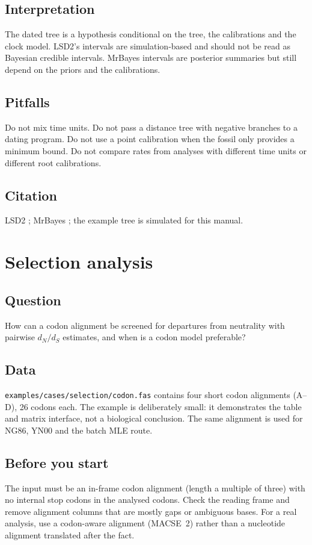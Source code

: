 \documentclass[11pt]{report}
\begin{document}
\section{Interpretation}
The dated tree is a hypothesis conditional on the tree, the calibrations and
the clock model. LSD2's intervals are simulation-based and should not be read
as Bayesian credible intervals. MrBayes intervals are posterior summaries but
still depend on the priors and the calibrations.

\section{Pitfalls}
Do not mix time units. Do not pass a distance tree with negative branches to a
dating program. Do not use a point calibration when the fossil only provides a
minimum bound. Do not compare rates from analyses with different time units or
different root calibrations.

\section{Citation}
LSD2 \cite{lsd2}; MrBayes \cite{mrbayes}; the example tree is simulated for
this manual.

\chapter{Selection analysis}
\section{Question}
How can a codon alignment be screened for departures from neutrality with
pairwise $d_N/d_S$ estimates, and when is a codon model preferable?

\section{Data}
\texttt{examples/cases/selection/codon.fas} contains four short codon
alignments (A--D), 26 codons each. The example is deliberately small: it
demonstrates the table and matrix interface, not a biological conclusion.
The same alignment is used for NG86, YN00 and the batch MLE route.

\section{Before you start}
The input must be an in-frame codon alignment (length a multiple of three)
with no internal stop codons in the analysed codons. Check the reading frame
and remove alignment columns that are mostly gaps or ambiguous bases. For a
real analysis, use a codon-aware alignment (MACSE~2) rather than a nucleotide
alignment translated after the fact.
\end{document}
